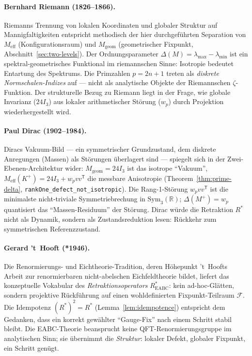 \documentclass[11pt,a4paper]{article}
\begin{document}
	\paragraph{Bernhard Riemann (1826--1866).}
	Riemanns Trennung von lokalen Koordinaten und globaler Struktur auf Mannigfaltigkeiten
	entspricht methodisch der hier durchgeführten Separation von
	$M_{\mathrm{eff}}$ (Konfigurationsraum) und $M_{\mathrm{geom}}$ (geometrischer Fixpunkt,
	Abschnitt~\ref{sec:two-levels}).
	Der Ordnungsparameter $\Delta(M)=\lambda_{\max}-\lambda_{\min}$ ist ein
	spektral-geometrisches Funktional im riemannschen Sinne: Isotropie bedeutet
	Entartung des Spektrums.
	Die Primzahlen $p=2n+1$ treten als \emph{diskrete Normschalen-Indizes} auf ---
	nicht als analytische Objekte der Riemannschen $\zeta$-Funktion.
	Der strukturelle Bezug zu Riemann liegt in der Frage, wie globale Invarianz
	($24I_3$) aus lokaler arithmetischer Störung ($w_p$) durch Projektion
	wiederhergestellt wird.
	
	\paragraph{Paul Dirac (1902--1984).}
	Diracs Vakuum-Bild --- ein symmetrischer Grundzustand, dem diskrete
	Anregungen (Massen) als Störungen überlagert sind --- spiegelt sich in der
	Zwei-Ebenen-Architektur wider:
	$M_{\mathrm{geom}}=24I_3$ ist das isotrope ``Vakuum'',
	$M_{\mathrm{eff}}(K^+)=24I_3+w_pvv^{\mathsf T}$ die messbare Anisotropie
	(Theorem~\ref{thm:prime-delta}, \texttt{rankOne\_defect\_not\_isotropic}).
	Die Rang-1-Störung $w_pvv^{\mathsf T}$ ist die minimalste nicht-triviale
	Symmetriebrechung in $\mathrm{Sym}_3(\mathbb{R})$; $\Delta(M^+)=w_p$ quantisiert
	das ``Massen-Residuum'' der Störung.
	Dirac würde die Retraktion $R^*$ nicht als Dynamik, sondern als
	Zustandsreduktion lesen: Rückkehr zum symmetrischen Referenzzustand.
	
	\paragraph{Gerard 't~Hooft (*1946).}
	Die Renormierungs- und Eichtheorie-Tradition, deren Höhepunkt 't~Hoofts Arbeit
	zur renormierbaren nicht-abelschen Eichfeldtheorie bildet, liefert das
	konzeptuelle Vokabular des \emph{Retraktionsoperators} $R^*_{\mathrm{EABC}}$:
	kein ad-hoc-Glätten, sondern projektive Rückführung auf einen wohldefinierten
	Fixpunkt-Teilraum $\mathcal{F}$.
	Die Idempotenz $(R^*)^2=R^*$ (Lemma~\ref{lem:idempotence}) entspricht dem
	Gedanken, dass ein korrekt gewählter ``Gauge-Fix'' nach einem Schritt stabil bleibt.
	Die EABC-Theorie beansprucht keine QFT-Renormierungsgruppe im analytischen Sinn;
	sie übernimmt die \emph{Struktur}: lokaler Defekt, globaler Fixpunkt, ein Schritt genügt.
	
\end{document}

